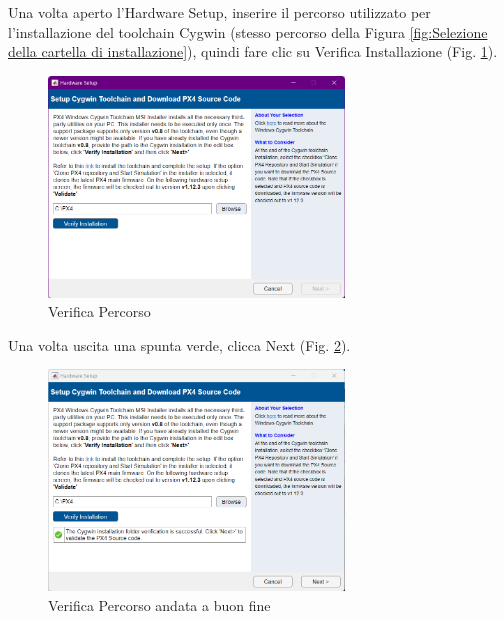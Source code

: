 Una volta aperto l'Hardware Setup, inserire il percorso utilizzato per l'installazione del toolchain Cygwin (stesso percorso della Figura \ref{fig:Selezione della cartella di installazione}), quindi fare clic su Verifica Installazione (Fig. \ref{fig:Verifica Percorso}).
\begin{figure}[H] %
  \centering
  \includegraphics[width=0.7\textwidth]{files/images/matlab3.png} %
  \caption{Verifica Percorso} %
  \label{fig:Verifica Percorso} %
\end{figure}
\noindent
Una volta uscita una spunta verde, clicca Next (Fig. \ref{fig:Verifica Percorso andata a buon fine}).
\begin{figure}[H] %
  \centering
  \includegraphics[width=0.7\textwidth]{files/images/matlab4.png} %
  \caption{Verifica Percorso andata a buon fine} %
  \label{fig:Verifica Percorso andata a buon fine} %
\end{figure}
